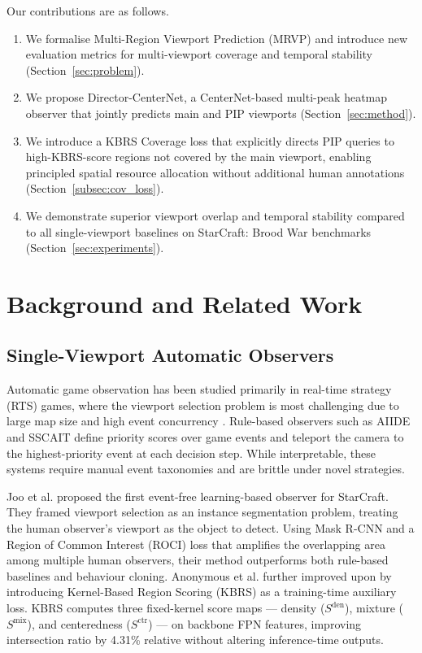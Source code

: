 \documentclass[preprint,12pt]{elsarticle}
\begin{document}
Our contributions are as follows.

\begin{enumerate}
  \item We formalise Multi-Region Viewport Prediction (MRVP) and introduce 
        new evaluation metrics for multi-viewport coverage and temporal 
        stability (Section~\ref{sec:problem}).
  \item We propose Director-CenterNet, a CenterNet-based multi-peak heatmap 
        observer that jointly predicts main and PIP viewports 
        (Section~\ref{sec:method}).
  \item We introduce a KBRS Coverage loss that explicitly directs PIP queries 
        to high-KBRS-score regions not covered by the main viewport, enabling 
        principled spatial resource allocation without additional human 
        annotations (Section~\ref{subsec:cov_loss}).
  \item We demonstrate superior viewport overlap and temporal stability 
        compared to all single-viewport baselines on StarCraft: Brood War 
        benchmarks (Section~\ref{sec:experiments}).
\end{enumerate}

\section{Background and Related Work}
\label{sec:related}

\subsection{Single-Viewport Automatic Observers}

Automatic game observation has been studied primarily in real-time strategy 
(RTS) games, where the viewport selection problem is most challenging due to 
large map size and high event concurrency \cite{ontanon2013survey}. 
Rule-based observers such as AIIDE and SSCAIT \cite{mattsson2015automatic} 
define priority scores over game events and teleport the camera to the 
highest-priority event at each decision step. While interpretable, these 
systems require manual event taxonomies and are brittle under novel strategies.

Joo et al. \cite{joo2023learning} proposed the first event-free learning-based 
observer for StarCraft. They framed viewport selection as an instance 
segmentation problem, treating the human observer's viewport as the object to 
detect. Using Mask R-CNN \cite{he2020mask} and a Region of Common Interest 
(ROCI) loss that amplifies the overlapping area among multiple human observers, 
their method outperforms both rule-based baselines and behaviour cloning. 
Anonymous et al. \cite{anonymous2025kbrs} further improved upon 
\cite{joo2023learning} by introducing Kernel-Based Region Scoring (KBRS) as 
a training-time auxiliary loss. KBRS computes three fixed-kernel score maps — 
density ($S^{\text{den}}$), mixture ($S^{\text{mix}}$), and centeredness 
($S^{\text{ctr}}$) — on backbone FPN features, improving intersection ratio 
by 4.31\% relative without altering inference-time outputs.
\end{document}
